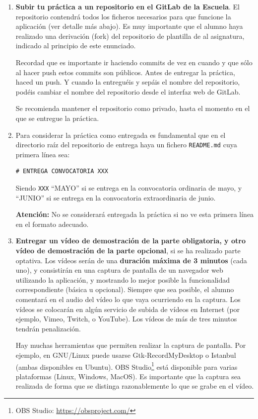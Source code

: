 \begin{enumerate}
  
  \item {\bf Subir tu práctica a un repositorio en el GitLab de la Escuela}. El repositorio contendrá todos los ficheros necesarios para que funcione la aplicación (ver detalle más abajo). Es muy importante que el alumno haya realizado una derivación (fork) del repositorio de plantilla de al asignatura, indicado al principio de este enunciado.

Recordad que es importante ir haciendo commits de vez en cuando y que sólo al hacer push estos commits son públicos. Antes de entregar la práctica, haced un push. Y cuando la entreguéis y sepáis el nombre del repositorio, podéis cambiar el nombre del repositorio desde el interfaz web de GitLab. 

Se recomienda mantener el repositorio como privado, hasta el momento en el que se entregue la práctica.

\item Para considerar la práctica como entregada es fundamental que en el directorio raíz del repositorio de entrega haya un fichero \texttt{README.md} cuya primera línea sea:

\begin{verbatim}
# ENTREGA CONVOCATORIA XXX
\end{verbatim}

Siendo \texttt{XXX} ``MAYO'' si se entrega en la convocatoria ordinaria de mayo, y ``JUNIO'' si se entrega en la convocatoria extraordinaria de junio.

\textbf{Atención:} No se considerará entregada la práctica si no ve esta primera línea en el formato adecuado.

 \item {\bf Entregar un vídeo de demostración de la parte obligatoria, y otro vídeo de demostración de la parte opcional}, si se ha realizado parte optativa. Los vídeos serán de una {\bf duración máxima de 3 minutos} (cada uno), y consistirán en una captura de pantalla de un navegador web utilizando la aplicación, y mostrando lo mejor posible la funcionalidad correspondiente (básica u opcional). Siempre que sea posible, el alumno comentará en el audio del vídeo lo que vaya ocurriendo en la captura. Los vídeos se colocarán en algún servicio de subida de vídeos en Internet (por ejemplo, Vimeo, Twitch, o YouTube). Los vídeos de más de tres minutos tendrán penalización.

Hay muchas herramientas que permiten realizar la captura de pantalla. Por ejemplo, en GNU/Linux puede usarse Gtk-RecordMyDesktop o Istanbul (ambas disponibles en Ubuntu). OBS Studio\footnote{OBS Studio: \url{https://obsproject.com/}} está disponible para varias plataformas (Linux, Windows, MacOS). Es importante que la captura sea realizada de forma que se distinga razonablemente lo que se grabe en el vídeo.


\end{enumerate}
